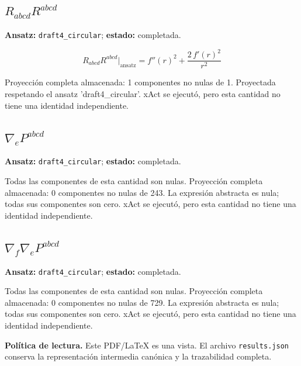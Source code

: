\documentclass[11pt]{article}
\begin{document}
\subsection*{$ R_{abcd}R^{abcd} $}
\textbf{Ansatz:} \texttt{draft4\_circular}; \textbf{estado:} completada.\par
\begin{dmath*}[breakdepth={5}]
R_{abcd}R^{abcd}\big|_{\mathrm{ansatz}} = {f''\!\left(r\right)}^{2} + \frac{2\,{f'\!\left(r\right)}^{2}}{{r}^{2}}
\end{dmath*}
\par\smallskip
Proyección completa almacenada: 1 componentes no nulas de 1. Proyectada respetando el ansatz 'draft4\_circular'. xAct se ejecutó, pero esta cantidad no tiene una identidad independiente.\par\medskip
{}
\subsection*{$ \nabla_e P^{abcd} $}
\textbf{Ansatz:} \texttt{draft4\_circular}; \textbf{estado:} completada.\par
Todas las componentes de esta cantidad son nulas.
Proyección completa almacenada: 0 componentes no nulas de 243. La expresión abstracta es nula; todas sus componentes son cero. xAct se ejecutó, pero esta cantidad no tiene una identidad independiente.\par\medskip
{}
\subsection*{$ \nabla_f\nabla_e P^{abcd} $}
\textbf{Ansatz:} \texttt{draft4\_circular}; \textbf{estado:} completada.\par
Todas las componentes de esta cantidad son nulas.
Proyección completa almacenada: 0 componentes no nulas de 729. La expresión abstracta es nula; todas sus componentes son cero. xAct se ejecutó, pero esta cantidad no tiene una identidad independiente.\par\medskip
\bigskip\noindent\textbf{Política de lectura.} Este PDF/LaTeX es una vista. El archivo \texttt{results.json} conserva la representación intermedia canónica y la trazabilidad completa.
\end{document}
